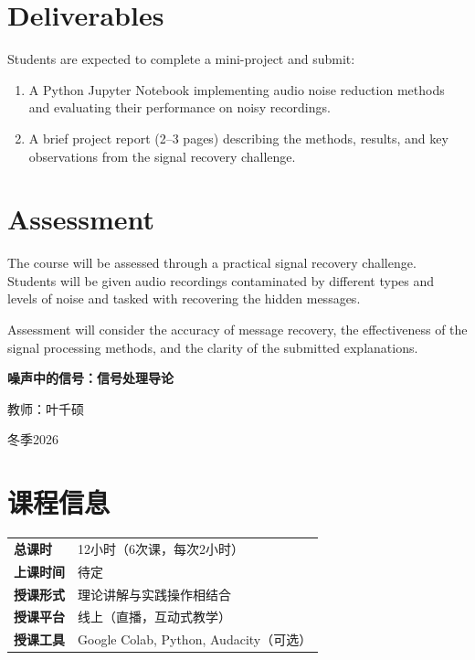 \documentclass[12pt,fontset=none]{ctexart}
\newcommand{\coursetitle}[3]{%
  \begin{center}
    {\LARGE #1\par}
    \vspace{1.4em}
    {\large #2\par}
    \vspace{0.3em}
    {\large #3\par}
  \end{center}
}
\begin{document}
\section{Deliverables}

Students are expected to complete a mini-project
and submit:

\begin{enumerate}
  \item A Python Jupyter Notebook implementing
  audio noise reduction methods and evaluating
  their performance on noisy recordings.

  \item A brief project report (2--3 pages)
  describing the methods, results, and key
  observations from the signal recovery challenge.
\end{enumerate}

\section{Assessment}

The course will be assessed through a practical
signal recovery challenge. Students will be given
audio recordings contaminated by different types
and levels of noise and tasked with recovering
the hidden messages.

Assessment will consider the accuracy of message
recovery, the effectiveness of the signal processing
methods, and the clarity of the submitted explanations.


\clearpage
\setcounter{section}{0}
\renewcommand{\theHsection}{zh.\arabic{section}}

\coursetitle
  {\textbf{噪声中的信号：信号处理导论}}
  {教师：叶千硕}
  {冬季2026}

\thispagestyle{plain}

\section{课程信息}

\begin{tabular}{@{}>{\bfseries}l l@{}}
总课时 & 12小时（6次课，每次2小时） \\
上课时间 & 待定 \\
授课形式 & 理论讲解与实践操作相结合 \\
授课平台 & 线上（直播，互动式教学） \\
授课工具 & Google Colab, Python, Audacity（可选） \\
\end{tabular}
\end{document}
